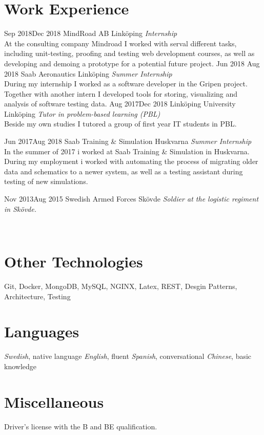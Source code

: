 \documentclass[]{k-cv} %
\begin{document}
\section{Work Experience}
\begin{entrylist}

\entry
{Sep 2018\newline \to Dec 2018}
{MindRoad AB}
{Linköping}
{\emph{Internship}\\ At the consulting company Mindroad I worked with serval different tasks,
including unit-testing, proofing and testing web development courses, as well as
developing and demoing a prototype for a potential future project.}
\entry
{Jun 2018 \newline\to Aug 2018}
{Saab Aeronautics}
{Linköping}
{\emph{Summer Internship} \\During my internship I worked as a software developer in the Gripen project. Together with another intern I developed tools for storing, visualizing and analysis of software testing data.}
\entry
{Aug 2017\newline\to Dec 2018}
{Linköping University}
{Linköping}
{\emph{Tutor in problem-based learning (PBL)} \\
Beside my own studies I tutored a group of first year IT students in PBL.}

\entry
{Jun 2017\newline\to Aug 2018}
{Saab Training \& Simulation}
{Huskvarna}
{\emph{Summer Internship} \\
In the summer of 2017 i worked at Saab Training \& Simulation in Huskvarna.
During my employment i worked with automating the process of migrating older
data and schematics to a newer system, as well as a testing assistant during
testing of new simulations.}

\entry
{Nov 2013\newline\to Aug 2015}
{Swedish Armed Forces}
{Skövde}
{\emph{Soldier at the logistic regiment in
Skövde.}}


\end{entrylist}
\clearpage
{}

\begin{aside}
~
~\color{gray}
\section{Other Technologies}
Git, Docker, MongoDB, MySQL, NGINX, Latex, REST, Desgin Patterns, Architecture, Testing

\section{Languages}
\textit{Swedish}, native language
\textit{English}, fluent
\textit{Spanish}, conversational
\textit{Chinese}, basic knowledge
\section{Miscellaneous}
Driver's license with the B and BE qualification.
\end{aside}
\end{document}
